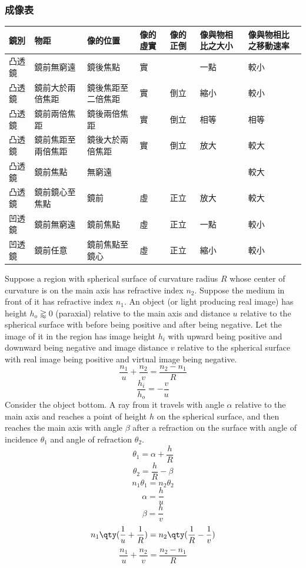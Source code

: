 \documentclass[a4paper,12pt]{report}
\begin{document}
\subsubsection{成像表}
\bct
\begin{longtable}[c]{|p{0.05\tw}|p{0.15\tw}|p{0.15\tw}|p{0.05\tw}|p{0.05\tw}|p{0.1\tw}|p{0.1\tw}|}
\hline
鏡別  & 物距        & 像的位置      & 像的虛實 & 像的正倒 & 像與物相比之大小 & 像與物相比之移動速率 \\\hline
凸透鏡 & 鏡前無窮遠     & 鏡後焦點      & 實    &      & 一點       & 較小         \\\hline
凸透鏡 & 鏡前大於兩倍焦距  & 鏡後焦距至二倍焦距 & 實    & 倒立   & 縮小       & 較小         \\\hline
凸透鏡 & 鏡前兩倍焦距    & 鏡後兩倍焦距    & 實    & 倒立   & 相等       & 相等         \\\hline
凸透鏡 & 鏡前焦距至兩倍焦距 & 鏡後大於兩倍焦距  & 實    & 倒立   & 放大       & 較大         \\\hline
凸透鏡 & 鏡前焦點      & 無窮遠       &      &      &          & 較大         \\\hline
凸透鏡 & 鏡前鏡心至焦點   & 鏡前        & 虛    & 正立   & 放大       & 較大         \\\hline
凹透鏡 & 鏡前無窮遠     & 鏡前焦點      & 虛    & 正立   & 一點       & 較小         \\\hline
凹透鏡 & 鏡前任意      & 鏡前焦點至鏡心   & 虛    & 正立   & 縮小       & 較小         \\\hline
\end{longtable}
\ect
{}
Suppose a region with spherical surface of curvature radius $R$ whose center of curvature is on the main axis has refractive index $n_2$. Suppose the medium in front of it has refractive index $n_1$. An object (or light producing real image) has height $h_o\gtrapprox0$ (paraxial) relative to the main axis and distance $u$ relative to the spherical surface with before being positive and after being negative. Let the image of it in the region has image height $h_i$ with upward being positive and downward being negative and image distance $v$ relative to the spherical surface with real image being positive and virtual image being negative.
\[\frac{n_1}{u}+\frac{n_2}{v}=\frac{n_2-n_1}{R}\]
\[\frac{h_i}{h_o}=-\frac{v}{u}\]
\bpr
Consider the object bottom. A ray from it travels with angle $\alpha$ relative to the main axis and reaches a point of height $h$ on the spherical surface, and then reaches the main axis with angle $\beta$ after a refraction on the surface with angle of incidence $\theta_1$ and angle of refraction $\theta_2$.
\[\theta_1=\alpha+\frac{h}{R}\]
\[\theta_2=\frac{h}{R}-\beta\]
\[n_1\theta_1=n_2\theta_2\]
\[\alpha=\frac{h}{u}\]
\[\beta=\frac{h}{v}\]
\[n_1\qty(\frac{1}{u}+\frac{1}{R})=n_2\qty(\frac{1}{R}-\frac{1}{v})\]
\[\frac{n_1}{u}+\frac{n_2}{v}=\frac{n_2-n_1}{R}\]
\epr
\end{document}
